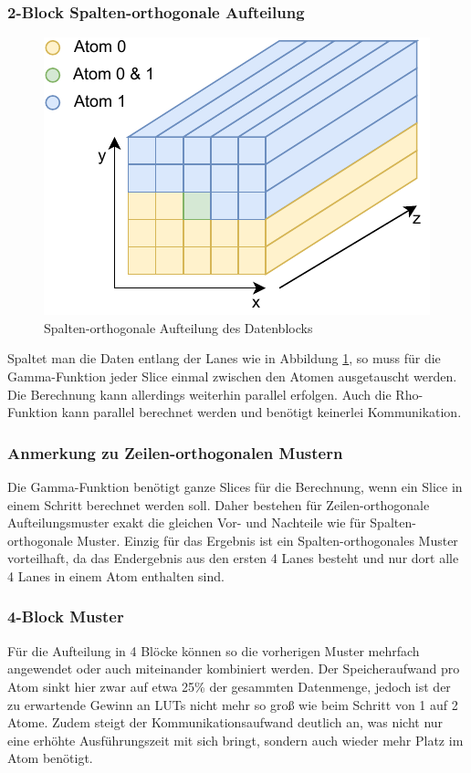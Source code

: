 \subsubsection{2-Block Spalten-orthogonale Aufteilung}
\label{cha:iteration_1_optimierungen_spaltenorthogonal}
\begin{figure}
    \center
    \includegraphics{images/Spaltenorthogonal.pdf}
    \caption{Spalten-orthogonale Aufteilung des Datenblocks}
    \label{fig:2_block_spaltenorthogonal}
\end{figure}
Spaltet man die Daten entlang der Lanes wie in Abbildung \ref{fig:2_block_spaltenorthogonal}, so muss für die Gamma-Funktion jeder Slice
einmal zwischen den Atomen ausgetauscht werden. Die Berechnung kann allerdings weiterhin parallel erfolgen. Auch die Rho-Funktion kann
parallel berechnet werden und benötigt keinerlei Kommunikation.

\subsubsection{Anmerkung zu Zeilen-orthogonalen Mustern}
Die Gamma-Funktion benötigt ganze Slices für die Berechnung, wenn ein Slice in einem Schritt berechnet werden soll.
Daher bestehen für Zeilen-orthogonale Aufteilungsmuster exakt die gleichen Vor- und Nachteile wie für Spalten-orthogonale Muster.
Einzig für das Ergebnis ist ein Spalten-orthogonales Muster vorteilhaft, da das Endergebnis aus den ersten 4 Lanes besteht und nur dort alle 4 Lanes in einem Atom enthalten sind.

\subsubsection{4-Block Muster}
Für die Aufteilung in 4 Blöcke können so die vorherigen Muster mehrfach angewendet oder auch miteinander kombiniert werden.
Der Speicheraufwand pro Atom sinkt hier zwar auf etwa 25\% der gesammten Datenmenge, jedoch ist der zu erwartende Gewinn an LUTs nicht mehr so groß wie beim Schritt von 1 auf 2 Atome.
Zudem steigt der Kommunikationsaufwand deutlich an, was nicht nur eine erhöhte Ausführungszeit mit sich bringt, sondern auch wieder mehr Platz im Atom benötigt.